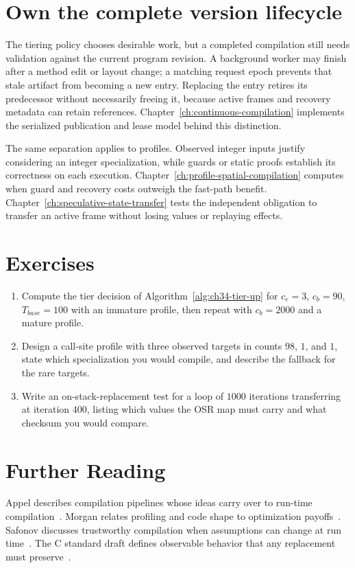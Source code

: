 \section{Own the complete version lifecycle}
\label{sec:ch34-lifecycle-link}

The tiering policy chooses desirable work, but a completed compilation still needs validation against the current program revision.
A background worker may finish after a method edit or layout change; a matching request epoch prevents that stale artifact from becoming a new entry.
Replacing the entry retires its predecessor without necessarily freeing it, because active frames and recovery metadata can retain references.
Chapter~\ref{ch:continuous-compilation} implements the serialized publication and lease model behind this distinction.

The same separation applies to profiles.
Observed integer inputs justify considering an integer specialization, while guards or static proofs establish its correctness on each execution.
Chapter~\ref{ch:profile-spatial-compilation} computes when guard and recovery costs outweigh the fast-path benefit.
Chapter~\ref{ch:speculative-state-transfer} tests the independent obligation to transfer an active frame without losing values or replaying effects.

\section{Exercises}\label{sec:ch34-exercises}

\begin{enumerate}
\item Compute the tier decision of Algorithm~\ref{alg:ch34-tier-up} for $c_e = 3$, $c_b = 90$, $T_{base} = 100$ with an immature profile, then repeat with $c_b = 2000$ and a mature profile.\label{ex:ch34-tier-math}
\item Design a call-site profile with three observed targets in counts $98$, $1$, and $1$, state which specialization you would compile, and describe the fallback for the rare targets.\label{ex:ch34-call-profile}
\item Write an on-stack-replacement test for a loop of $1000$ iterations transferring at iteration $400$, listing which values the OSR map must carry and what checksum you would compare.\label{ex:ch34-osr-test}
\end{enumerate}

\section{Further Reading}\label{sec:ch34-reading}

Appel describes compilation pipelines whose ideas carry over to run-time compilation~\cite{appel-1998-modern}.
Morgan relates profiling and code shape to optimization payoffs~\cite{morgan-1998-optimizing}.
Safonov discusses trustworthy compilation when assumptions can change at run time~\cite{safonov-2010-trustworthy}.
The C standard draft defines observable behavior that any replacement must preserve~\cite{wg14-2011-c11}.

